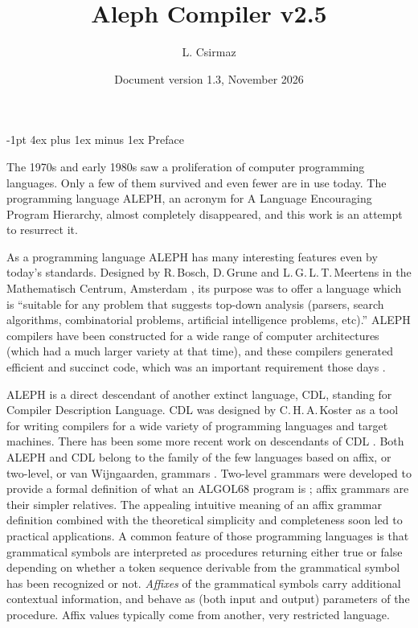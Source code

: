 \documentclass[titlepage]{article}
\title{\bf Aleph Compiler v2.5}
\author{L. Csirmaz}
\date{\normalsize Document version 1.3, November 2026}
\makeatletter
\newcommand\A{\textsf{ALEPH}}
\newcommand\g[1]{\textsf{\color{blue!90!black}#1}}
\renewcommand\section{%
\newpage
\@startsection{section}{1}{\z@}%
   {-1pt}%
   {4ex plus 1ex minus 1ex}%
   {\normalfont\Large\bfseries}}
\let\osection\section
\def\section {\newpage\osection}
\makeatother
\begin{document}
\thispagestyle{empty}
\hypersetup{pageanchor=false} %
\maketitle
\newpage
\hypersetup{pageanchor=true}

\section{Preface}

The 1970s and early 1980s saw a proliferation of computer programming languages. Only a
few of them survived and even fewer are in use today. The programming
language \A, an acronym for {\sf A} {\sf L}anguage {\sf E}ncouraging {\sf
P}rogram {\sf H}ierarchy, almost completely disappeared, and this work is an
attempt to resurrect it.

As a programming language \A{} has many interesting features even by today's
standards. Designed by R.\,Bosch, D.\,Grune and L.\,G.\,L.\,T.\,Meertens in
the Mathematisch Centrum, Amsterdam \cite{A-manual}, its purpose was to
offer a language which is ``suitable for any problem that suggests top-down
analysis (parsers, search algorithms, combinatorial problems, artificial
intelligence problems, etc).'' \A{} compilers have been constructed for a
wide range of computer architectures (which had a much larger variety at
that time), and these compilers generated efficient and succinct code, which
was an important requirement those days \cite{grune}.

\A{} is a direct descendant of another extinct language, \g{CDL}, standing
for {\sf C}ompiler {\sf D}escription {\sf L}anguage. \g{CDL} was designed by
C.\,H.\,A.\,Koster \cite{koster1,koster3} as a tool for writing compilers
for a wide variety of programming languages and target machines. There has
been some more recent work on descendants of \g{CDL} \cite{cdl3}. Both \A{}
and \g{CDL} belong to the family of the few languages based on affix, or
two-level, or van Wijngaarden, grammars \cite{koster2,wijn}. Two-level
grammars were developed to provide a formal definition of what an \g{ALGOL68}
program is \cite{a68}; affix grammars are their simpler relatives. The appealing intuitive meaning of an affix grammar
definition combined with the theoretical simplicity and completeness soon
led to practical applications. A common feature of those programming
languages is that grammatical symbols are interpreted as procedures
returning either true or false depending on whether a token sequence
derivable from the grammatical symbol has been recognized or not.
\emph{Affixes} of the grammatical symbols carry additional contextual
information, and behave as (both input and output) parameters of the
procedure. Affix values typically come from another, very restricted
language.
\end{document}
